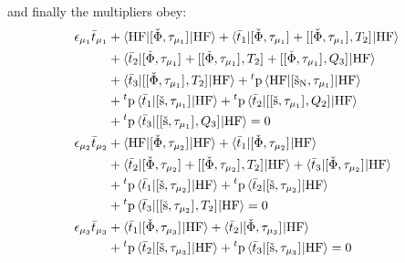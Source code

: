and finally the multipliers obey:
\begin{subequations}\label{eq:pted-cc3-multipliers}
  \begin{align}
    \epsilon_{\mu_1}\bar{t}_{\mu_1} &+
     \braket{\mathrm{HF} | [ \check{\Phi}, \tau_{\mu_1} ]^{} | \mathrm{HF}}
   + \braket{\bar{t}_{1} |
       [ \check{\Phi}, \tau_{\mu_1} ]^{}
     + [ [ \check{\Phi}, \tau_{\mu_1} ]^{}, T_2 ]^{}
     | \mathrm{HF}} \nonumber \\
   &+ \braket{\bar{t}_{2} |
       [ \check{\Phi}, \tau_{\mu_1} ]^{}
     + [ [ \check{\Phi}, \tau_{\mu_1} ]^{}, T_2 ]^{}
     + [ [ \check{\Phi}, \tau_{\mu_1} ]^{}, Q_3 ]^{}
   | \mathrm{HF}} \nonumber \\
   &+ \braket{\bar{t}_{3} |
      [ [ \check{\Phi}, \tau_{\mu_1} ]^{}, T_2 ]^{}
     | \mathrm{HF}}
   + {}^t\mathrm{p}\braket{\mathrm{HF} |
   [ \check{\mathrm{s}}_\mathrm{N}, \tau_{\mu_1} ]^{} | \mathrm{HF}}  \nonumber \\
   &+ {}^t\mathrm{p}\braket{\bar{t}_{1} | [ \check{\mathrm{s}}, \tau_{\mu_1} ]^{} | \mathrm{HF}}
   + {}^t\mathrm{p}\braket{\bar{t}_{2} |
   [ [ \check{\mathrm{s}}, \tau_{\mu_1} ]^{}, Q_2 ]^{} |
   \mathrm{HF}} \nonumber \\
   &+ {}^t\mathrm{p}\braket{\bar{t}_{3} | [ [ \check{\mathrm{s}}, \tau_{\mu_1} ]^{}, Q_3 ]^{} | \mathrm{HF}}
     = 0 \label{eq:pted-cc3-singles-multipliers} \\
    \epsilon_{\mu_2}\bar{t}_{\mu_2} &+
    \braket{\mathrm{HF} | [ \check{\Phi}, \tau_{\mu_2} ]^{} | \mathrm{HF}}
   + \braket{\bar{t}_{1} |
       [ \check{\Phi}, \tau_{\mu_2} ]^{}
     | \mathrm{HF}} \nonumber \\
  &+ \braket{\bar{t}_{2} |
       [ \check{\Phi}, \tau_{\mu_2} ]^{}
     + [ [ \check{\Phi}, \tau_{\mu_2} ]^{}, T_2 ]^{}
     | \mathrm{HF}}
  + \braket{\bar{t}_{3} |
       [ \check{\Phi}, \tau_{\mu_2} ]^{}
     | \mathrm{HF}} \nonumber \\
   &+ {}^t\mathrm{p}\braket{\bar{t}_{1} | [ \check{\mathrm{s}}, \tau_{\mu_2} ]^{} | \mathrm{HF}}
   + {}^t\mathrm{p}\braket{\bar{t}_{2} | [ \check{\mathrm{s}}, \tau_{\mu_2} ]^{} | \mathrm{HF}}
   \nonumber \\
   &+ {}^t\mathrm{p}\braket{\bar{t}_{3} |
   [ [ \check{\mathrm{s}}, \tau_{\mu_2} ]^{}, T_2 ]^{} | \mathrm{HF}}
    = 0 \label{eq:pted-cc3-doubles-multipliers} \\
    \epsilon_{\mu_3}\bar{t}_{\mu_3} &+
    \braket{\bar{t}_{1} |
       [ \check{\Phi}, \tau_{\mu_3} ]^{}
     | \mathrm{HF}}
  + \braket{\bar{t}_{2} |
       [ \check{\Phi}, \tau_{\mu_3} ]^{}
     | \mathrm{HF}} \nonumber \\
   &+ {}^t\mathrm{p}\braket{\bar{t}_{2} | [ \check{\mathrm{s}}, \tau_{\mu_3} ]^{} | \mathrm{HF}}
   + {}^t\mathrm{p}\braket{\bar{t}_{3} | [ \check{\mathrm{s}}, \tau_{\mu_3} ]^{} | \mathrm{HF}}
    = 0 \label{eq:pted-cc3-triples-multipliers}
  \end{align}
\end{subequations}
